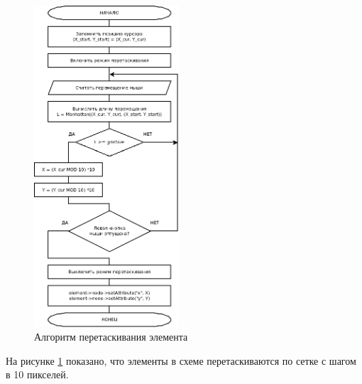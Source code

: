 \begin{figure}[H]
  \centering
  \includegraphics[width=0.48\textwidth]{diagrams/block-schemes/drag.png}
  \caption{Алгоритм перетаскивания элемента}
  \label{fig:drag}
\end{figure}

На рисунке \ref{fig:drag} показано, что элементы в схеме перетаскиваются по сетке с шагом в 10 пикселей.